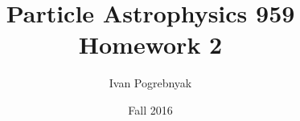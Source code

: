\documentclass[12pt]{article}
\title{Particle Astrophysics 959 Homework 2}
\author{Ivan Pogrebnyak}
\date{Fall 2016}
\begin{document}
\maketitle


\section{}


\section{}


\section{}


\section{}


\section{}


\section{}


\section{}


\section{}



\end{document}
